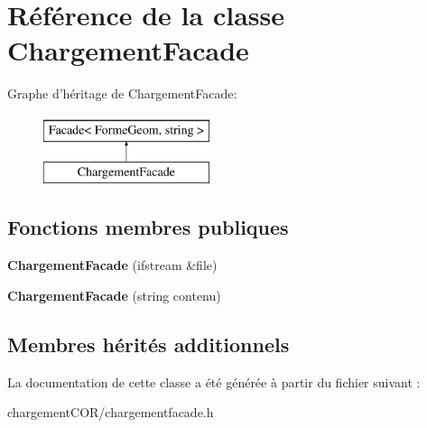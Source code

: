 \hypertarget{class_chargement_facade}{\section{Référence de la classe Chargement\+Facade}
\label{class_chargement_facade}
}
Graphe d'héritage de Chargement\+Facade\+:\begin{figure}[H]
\begin{center}
\leavevmode
\includegraphics[height=2.000000cm]{class_chargement_facade}
\end{center}
\end{figure}
\subsection*{Fonctions membres publiques}
\begin{DoxyCompactItemize}
\item 
\hypertarget{class_chargement_facade_a11b9b3e10e86363a11ac00474ef41a68}{{\bfseries Chargement\+Facade} (ifstream \&file)}\label{class_chargement_facade_a11b9b3e10e86363a11ac00474ef41a68}

\item 
\hypertarget{class_chargement_facade_aaabf98f68708f461ce8d98a42c2b6b59}{{\bfseries Chargement\+Facade} (string contenu)}\label{class_chargement_facade_aaabf98f68708f461ce8d98a42c2b6b59}

\end{DoxyCompactItemize}
\subsection*{Membres hérités additionnels}


La documentation de cette classe a été générée à partir du fichier suivant \+:\begin{DoxyCompactItemize}
\item 
chargement\+C\+O\+R/chargementfacade.\+h\end{DoxyCompactItemize}
